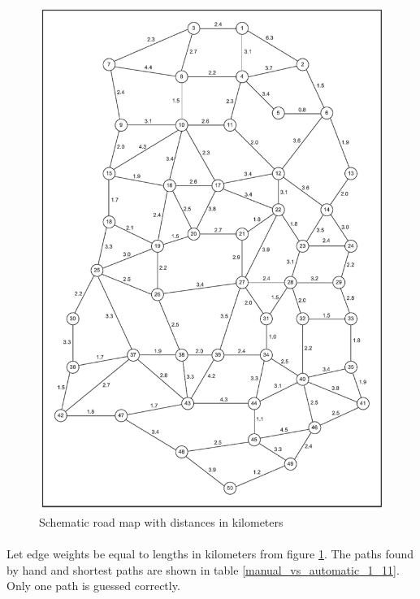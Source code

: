 \begin{figure}[H]
	\centering
	\includegraphics[scale=1]{./img/figure1-10.png}
	\caption{Schematic road map with distances in kilometers}
	\label{figure1-10}
\end{figure}

\paragraph{}
Let edge weights be equal to lengths in kilometers from figure \ref{figure1-10}. The paths found by hand and shortest paths are shown in table \ref{manual_vs_automatic_1_11}. Only one path is guessed correctly.

